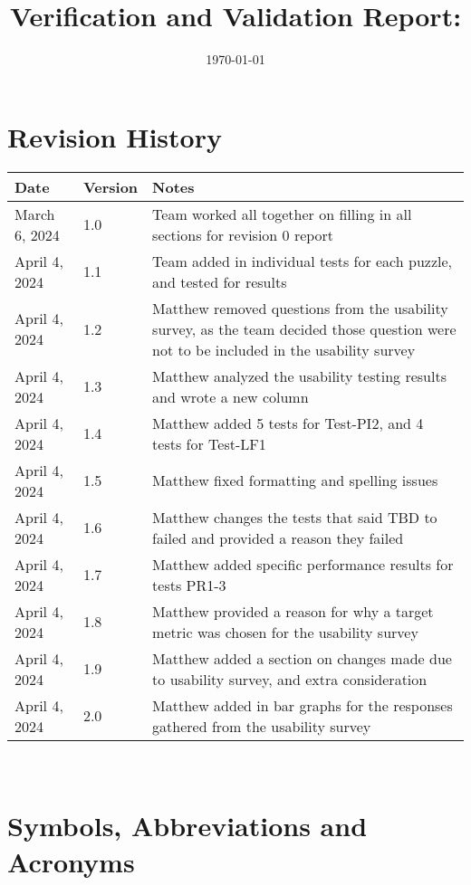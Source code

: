 \documentclass[12pt, titlepage]{article}
\begin{document}
\title{Verification and Validation Report: \progname} 
\author{\authname}
\date{\today}
	
\maketitle


\section{Revision History}

\begin{tabularx}{\textwidth}{p{3cm}p{2cm}X}
\toprule {\bf Date} & {\bf Version} & {\bf Notes}\\
\midrule
March 6, 2024 & 1.0 & Team worked all together on filling in all sections for revision 0 report\\
April 4, 2024 & 1.1 & Team added in individual tests for each puzzle, and tested for results\\
April 4, 2024 & 1.2 & Matthew removed questions from the usability survey, as the team decided those question were not to be included in the usability survey\\
April 4, 2024 & 1.3 & Matthew analyzed the usability testing results and wrote a new column\\
April 4, 2024 & 1.4 & Matthew added 5 tests for Test-PI2, and 4 tests for Test-LF1\\
April 4, 2024 & 1.5 & Matthew fixed formatting and spelling issues\\
April 4, 2024 & 1.6 & Matthew changes the tests that said TBD to failed and provided a reason they failed\\
April 4, 2024 & 1.7 & Matthew added specific performance results for tests PR1-3\\
April 4, 2024 & 1.8 & Matthew provided a reason for why a target metric was chosen for the usability survey\\
April 4, 2024 & 1.9 & Matthew added a section on changes made due to usability survey, and extra consideration\\
April 4, 2024 & 2.0 & Matthew added in bar graphs for the responses gathered from the usability survey\\

\bottomrule
\end{tabularx}

~\newpage

\section{Symbols, Abbreviations and Acronyms}
\end{document}
